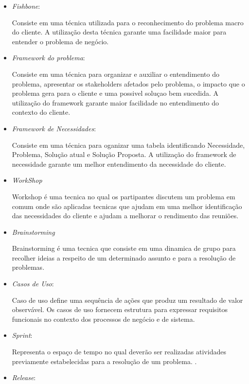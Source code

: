 \begin{itemize}
	\item \textit{Fishbone}:

		Consiste em uma técnica utilizada para o reconhecimento do problema macro do cliente. A utilização desta técnica garante uma facilidade maior para entender o problema de negócio.

	\item \textit{Framework do problema}:

		Consiste em uma técnica para organizar e auxiliar o entendimento do problema, apresentar os stakeholders afetados pelo problema, o impacto que o problema gera para o cliente e uma possivel soluçao bem sucedida. A utilização do framework garante maior facilidade no entendimento do contexto do cliente.

	\item \textit{Framework de Necessidades}:

		Consiste em uma técnica para oganizar uma tabela identificando Necessidade, Problema, Solução atual e Solução Proposta. A utilização do framework de necessidade garante um melhor entendimento da necessidade do cliente.
 
	\item \textit{WorkShop}

		 Workshop é uma tecnica no qual os partipantes discutem um problema em comum onde são aplicadas tecnicas que ajudam em uma melhor identificação das necessidades do cliente e ajudam a melhorar o rendimento das reuniões.

	\item \textit{Brainstorming}

		 Brainstorming é uma tecnica que consiste em uma dinamica de grupo para recolher ideias a respeito de um determinado assunto e para a resolução de problemas.

	\item \textit{Casos de Uso}:

		 Caso de uso define uma sequência de ações que produz um resultado de valor observável. Os casos de uso fornecem estrutura para expressar requisitos funcionais no contexto dos processos de negócio e de sistema.

	\item \textit{Sprint}:

		Representa o espaço de tempo no qual deverão ser realizadas atividades previamente estabelecidas para a resolução de um problema. \cite{beck2000extreme}.

	\item \textit{Release}:


\end{itemize}
